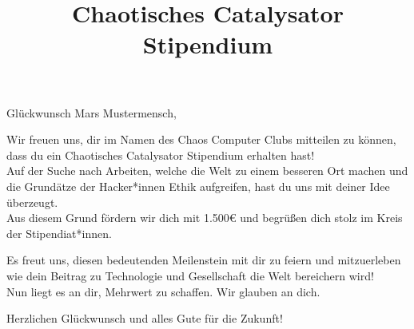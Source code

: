 \documentclass{article}
\title{Chaotisches Catalysator Stipendium}
\newcommand{\smallfont}[1]{{%
  \fontsize{12pt}{16pt}\normalfont #1%
}}
\newcommand{\normfont}[1]{{%
  \fontsize{18pt}{22pt}\normalfont #1%
}}
\newcommand{\bigfont}[1]{{%
  \fontsize{25pt}{30pt}\normalfont #1%
}}
\begin{document}
\begin{center}
\end{center}

\vspace{0.5cm}

\begin{adjustwidth}{4cm}{4cm}
    \smallfont{\firasans \RaggedRight
    Glückwunsch Mars Mustermensch, \bigskip
    
    Wir freuen uns, dir im Namen des Chaos Computer Clubs mitteilen zu können, dass du ein Chaotisches Catalysator Stipendium erhalten hast! \\ \bigskip
    Auf der Suche nach Arbeiten, welche die Welt zu einem besseren Ort machen und die Grundätze der Hacker*innen Ethik aufgreifen, hast du uns mit deiner Idee überzeugt. \\
    Aus diesem Grund fördern wir dich mit 1.500€ und begrüßen dich stolz im Kreis der Stipendiat*innen.\\ \bigskip

    Es freut uns, diesen bedeutenden Meilenstein mit dir zu feiern und mitzuerleben wie dein Beitrag zu Technologie und Gesellschaft die Welt bereichern wird! \\ 
    Nun liegt es an dir, Mehrwert zu schaffen. Wir glauben an dich. \\ \bigskip
    
    Herzlichen Glückwunsch und alles Gute für die Zukunft!\\[3\baselineskip]
    \par}
\end{adjustwidth}
\end{document}
